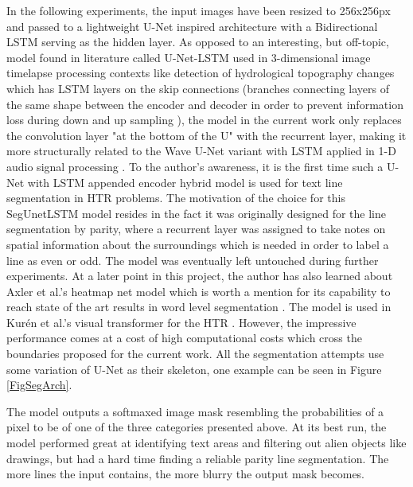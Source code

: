 In the following experiments, the input images have been resized to 256x256px and passed to a lightweight U-Net inspired architecture with a Bidirectional LSTM serving as the hidden layer. As opposed to an interesting, but off-topic, model found in literature called U-Net-LSTM used in 3-dimensional image timelapse processing contexts like detection of hydrological topography changes \cite{unetlstm} which has LSTM layers on the skip connections (branches connecting layers of the same shape between the encoder and decoder in order to prevent information loss during down and up sampling \cite{unet}), the model in the current work only replaces the convolution layer "at the bottom of the U" with the recurrent layer, making it more structurally related to the Wave U-Net variant with LSTM applied in 1-D audio signal processing \cite{waveunet}. To the author's awareness, it is the first time such a U-Net with LSTM appended encoder hybrid model is used for text line segmentation in HTR problems. The motivation of the choice for this SegUnetLSTM model resides in the fact it was originally designed for the line segmentation by parity, where a recurrent layer was assigned to take notes on spatial information about the surroundings which is needed in order to label a line as even or odd. The model was eventually left untouched during further experiments. At a later point in this project, the author has also learned about Axler et al.'s heatmap net model which is worth a mention for its capability to reach state of the art results in word level segmentation \cite{wordseg}. The model is used in  Kur{\'e}n et al.'s visual transformer for the HTR \cite{vit_htr}. However, the impressive performance comes at a cost of high computational costs which cross the boundaries proposed for the current work. All the segmentation attempts use some variation of U-Net as their skeleton, one example can be seen in Figure \ref{FigSegArch}.

The model outputs a softmaxed image mask resembling the probabilities of a pixel to be of one of the three categories presented above. At its best run, the model performed great at identifying text areas and filtering out alien objects like drawings, but had a hard time finding a reliable parity line segmentation. The more lines the input contains, the more blurry the output mask becomes. 

